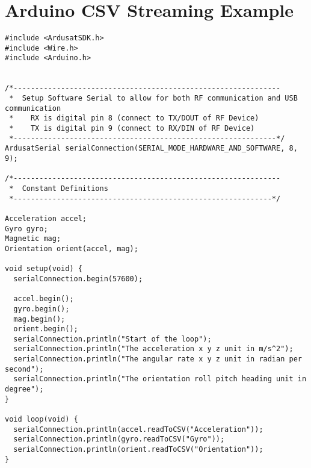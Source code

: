 \section{Arduino CSV Streaming Example}\label{appendix-CSV}
\begin{lstlisting}
#include <ArdusatSDK.h>
#include <Wire.h>
#include <Arduino.h>


/*--------------------------------------------------------------
 *  Setup Software Serial to allow for both RF communication and USB communication
 *    RX is digital pin 8 (connect to TX/DOUT of RF Device)
 *    TX is digital pin 9 (connect to RX/DIN of RF Device)
 *-------------------------------------------------------------*/
ArdusatSerial serialConnection(SERIAL_MODE_HARDWARE_AND_SOFTWARE, 8, 9); 

/*--------------------------------------------------------------
 *  Constant Definitions
 *------------------------------------------------------------*/
 
Acceleration accel;
Gyro gyro;
Magnetic mag;
Orientation orient(accel, mag);

void setup(void) {
  serialConnection.begin(57600);
  
  accel.begin();
  gyro.begin();
  mag.begin();
  orient.begin();
  serialConnection.println("Start of the loop");
  serialConnection.println("The acceleration x y z unit in m/s^2");
  serialConnection.println("The angular rate x y z unit in radian per second");
  serialConnection.println("The orientation roll pitch heading unit in degree");
}

void loop(void) {
  serialConnection.println(accel.readToCSV("Acceleration"));
  serialConnection.println(gyro.readToCSV("Gyro"));
  serialConnection.println(orient.readToCSV("Orientation"));
}

\end{lstlisting}


